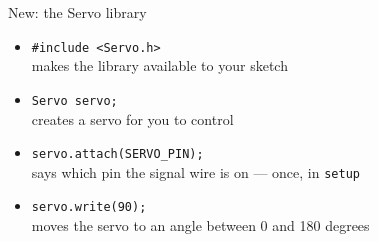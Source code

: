 \documentclass[aspectratio=169]{beamer}
\begin{document}
\begin{frame}[fragile]{New: the Servo library}
    \large
    \begin{itemize}
        \setlength{\itemsep}{1em}
        \item \texttt{#include <Servo.h>}\\
            makes the library available to your sketch
        \item \texttt{Servo servo;}\\
            creates a servo for you to control
        \item \texttt{servo.attach(SERVO_PIN);}\\
            says which pin the signal wire is on --- once, in \texttt{setup}
        \item \texttt{servo.write(90);}\\
            moves the servo to an angle between 0 and 180 degrees
    \end{itemize}
\end{frame}
\end{document}
